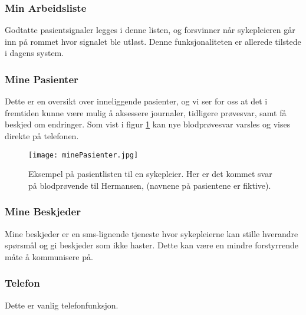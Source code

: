 \subsubsection{Min Arbeidsliste}
Godtatte pasientsignaler legges i denne listen, og forsvinner når sykepleieren går inn på rommet hvor signalet ble utløst. Denne funksjonaliteten er allerede tilstede i dagens system.

\subsubsection{Mine Pasienter}
Dette er en oversikt over inneliggende pasienter, og vi ser for oss at det i fremtiden kunne være mulig å aksessere journaler, tidligere prøvesvar, samt få beskjed om endringer. Som vist i figur \ref{minePasienter} kan nye blodprøvesvar varsles og vises direkte på telefonen.

\begin{figure}[H]
\centering
\texttt{[image: minePasienter.jpg]}
\caption{Eksempel på pasientlisten til en sykepleier. Her er det kommet svar på blodprøvende til Hermansen, (navnene på pasientene er fiktive).}
\label{minePasienter}
\end{figure}

\subsubsection{Mine Beskjeder}
Mine beskjeder er en sms-lignende tjeneste hvor sykepleierne kan stille hverandre spørsmål og gi beskjeder som ikke haster. Dette kan være en mindre forstyrrende måte å kommunisere på.

\subsubsection{Telefon}
Dette er vanlig telefonfunksjon.



